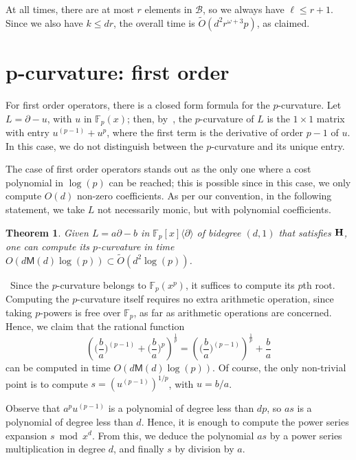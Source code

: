 \documentclass{sig-alternate}
\newcommand{\bigOsoft}{\tilde{O}}
\def\F {\mathbb{F}}
\def\M{\ensuremath{\mathsf{M}}}
\def\myproof{\noindent{\sc Proof.}~}
\newtheorem{theorem}{Theorem}
\begin{document}
\smallskip\noindent
At all times, there are at most $r$ elements in $\mathscr{B}$, so we
always have $\ell \le r+1$. Since we also have $k \le dr$, the overall
time is $\bigOsoft(d^2 r^{\omega+3} p)$, as claimed.





\section{p-curvature: first order}\label{sec:one}

\noindent For first order operators, there is a closed form formula
for the $p$-curvature. Let $L=\partial-u$, with $u$ in $\F_p(x)$;
then, by~\cite[Lemma 1.4.2]{vanDerPut95}, the $p$-curvature of $L$ is the
$1\times 1$ matrix with entry $u^{(p-1)}+u^p$, where the first term is
the derivative of order $p-1$ of $u$. In this case, we do not
distinguish between the $p$-curvature and its unique entry.

The case of first order operators stands out as the only one where a
cost polynomial in $\log(p)$ can be reached; this is possible since in
this case, we only compute $O(d)$ non-zero coefficients. As per our
convention, in the following statement, we take $L$ not necessarily
monic, but with polynomial coefficients.

\begin{theorem}\label{theo:ordre1}
  Given $L=a\partial -b$ in $\F_p[x]\langle \partial \rangle$ of
  bidegree $(d,1)$ that satisfies $\bf H$, one can compute its
  $p$-curvature in time $O(d\M(d)\log(p))\subset \bigOsoft(d^2
  \log(p))$.
\end{theorem}
\myproof Since the $p$-curvature belongs to $\F_p(x^p)$, it suffices
to compute its $p$th root. Computing the $p$-curvature itself requires
no extra arithmetic operation, since taking $p$-powers is free 
over $\F_p$, as far as arithmetic operations are concerned.
Hence, we claim that the rational function
$$\left (  \Big(\frac ba\Big )^{(p-1)} + \Big(\frac ba\Big )^p\right
)^{\frac 1p}
=\left (  \Big(\frac ba\Big )^{(p-1)} \right
)^{\frac 1p} + \frac ba
$$
can be computed in time $O(d\M(d)\log(p))$.  Of course, the only
non-trivial point is to compute $s=(u^{(p-1)})^{1/p}$, with $u=b/a$.

Observe that $a^p u^{(p-1)}$ is a polynomial of degree less than $dp$,
so $as$ is a polynomial of degree less than $d$. Hence, it is enough
to compute the power series expansion $s \bmod x^d$. From this, we 
deduce the polynomial $as$ by a power series multiplication in degree
$d$, and finally $s$ by division by $a$.
\end{document}
